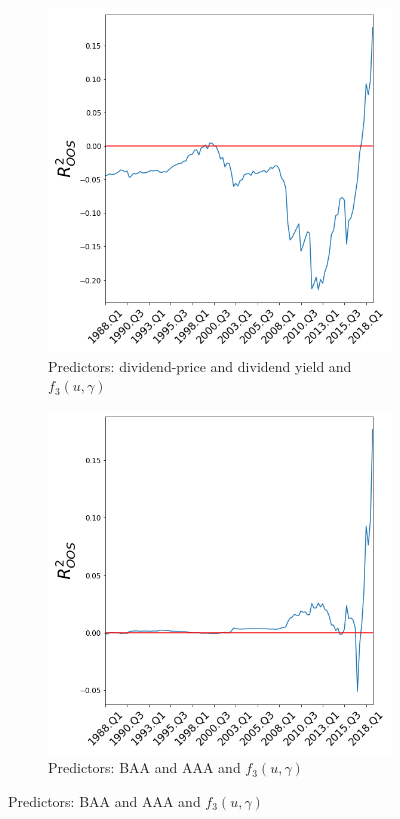 \documentclass[a4paper,12pt,times,numbered,print,index]{report}
\numberwithin{equation}{section}
\begin{document}
\begin{figure}[H]
		\medskip
		\begin{subfigure}{0.48\textwidth}
			\captionsetup{justification=centering}
			\includegraphics[width=0.8\linewidth]{plots/co3f3.png}
			\caption{Predictors: dividend-price and dividend yield and $f_{3}( u,\gamma)$ } \label{co3f3}
		\end{subfigure}\hspace*{\fill}
		\begin{subfigure}{0.48\textwidth}
			\captionsetup{justification=centering}
			\includegraphics[width=0.8\linewidth]{plots/co4f3.png}
			\caption{Predictors: BAA and AAA and $f_{3}( u,\gamma)$ } \label{co4f3}
		\end{subfigure}
	\end{figure}
	
\end{document}
